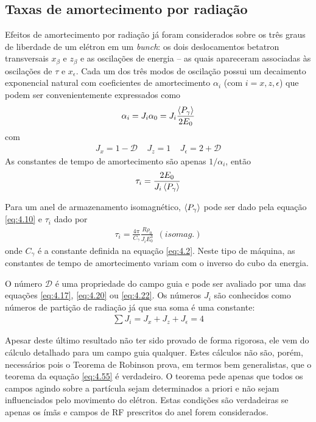 \subsection{Taxas de amortecimento por radiação}\label{sec:4.4}
Efeitos de amortecimento por radiação já foram considerados sobre os três graus de liberdade de um elétron em um \textit{bunch}: os dois deslocamentos betatron transversais $x_\beta$ e $z_\beta$ e as oscilações de energia -- as quais apareceram associadas às oscilações de $\tau$ e $x_\epsilon$. Cada um dos três modos de oscilação possui um decaimento exponencial natural com coeficientes de amortecimento $\alpha_i$ (com $i=x,z,\epsilon$) que podem ser convenientemente expressados como
\begin{align}
	\alpha_i = J_i \alpha_0 = J_i\frac{\left< P_\gamma \right>}{2E_0}
\end{align}
com
\begin{align}
	J_x=1-\mathscr{D}\ \ \ \ \ J_z=1\ \ \ \ \ J_\epsilon=2+\mathscr{D}\label{eq:4.52}
\end{align}
As constantes de tempo de amortecimento são apenas $1/\alpha_i$, então
\begin{align}
	\tau_i = \frac{2E_0}{J_i \left< P_\gamma \right>}\label{eq:4.53}
\end{align}

Para um anel de armazenamento isomagnético, $\left< P_\gamma \right>$ pode ser dado pela equação \eqref{eq:4.10} e $\tau_i$ dado por
\begin{align}
	\tau_i = \frac{4\pi}{C_\gamma}\frac{R\rho_0}{J_i E_0^3}\ \ (isomag.)
\end{align}
onde $C_\gamma$ é a constante definida na equação \eqref{eq:4.2}. Neste tipo de máquina, as constantes de tempo de amortecimento variam com o inverso do cubo da energia.

O número $\mathscr{D}$ é uma propriedade do campo guia e pode ser avaliado por uma das equações \eqref{eq:4.17}, \eqref{eq:4.20} ou \eqref{eq:4.22}. Os números $J_i$ são conhecidos como números de partição de radiação já que sua soma é uma constante:
\begin{align}
	\sum J_i = J_x + J_z + J_\epsilon = 4\label{eq:4.55}
\end{align}

Apesar deste último resultado não ter sido provado de forma rigorosa, ele vem do cálculo detalhado para um campo guia qualquer. Estes cálculos não são, porém, necessários pois o Teorema de Robinson prova, em termos bem generalistas, que o teorema da equação \eqref{eq:4.55} é verdadeiro. O teorema pede apenas que todos os campos agindo sobre a partícula sejam determinados a priori e não sejam influenciados pelo movimento do elétron. Estas condições são verdadeiras se apenas os ímãs e campos de RF prescritos do anel forem considerados.

